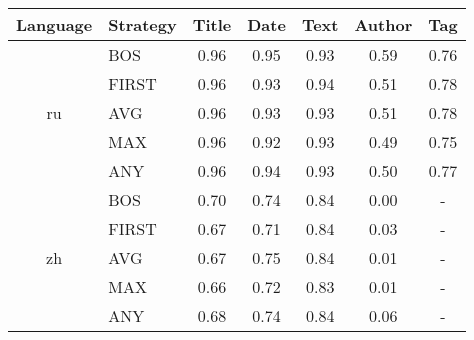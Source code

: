 \renewcommand{\arraystretch}{1.15}

\begin{tabular}{|c|l|ccccc|}
\hline
Language                & Strategy & Title & Date & Text & Author & Tag \\ \hline
\multirow{5}{*}{ru} & BOS & 0.96 & 0.95 & 0.93 & 0.59 & 0.76 \\
                    & FIRST     & 0.96 & 0.93 & 0.94 & 0.51 & 0.78 \\
                    & AVG       & 0.96 & 0.93 & 0.93 & 0.51 & 0.78      \\
                    & MAX       & 0.96 & 0.92 & 0.93 & 0.49 & 0.75      \\
                    & ANY       & 0.96 & 0.94 & 0.93 & 0.50 & 0.77      \\
                    \hline
\multirow{5}{*}{zh} & BOS       & 0.70 & 0.74 & 0.84 & 0.00 & -      \\
                    & FIRST     & 0.67 & 0.71 & 0.84 & 0.03 & -      \\
                    & AVG       & 0.67 & 0.75 & 0.84 & 0.01 & -      \\
                    & MAX       & 0.66 & 0.72 & 0.83 & 0.01 & -      \\
                    & ANY       & 0.68 & 0.74 & 0.84 & 0.06 & -      \\ \hline
\end{tabular}